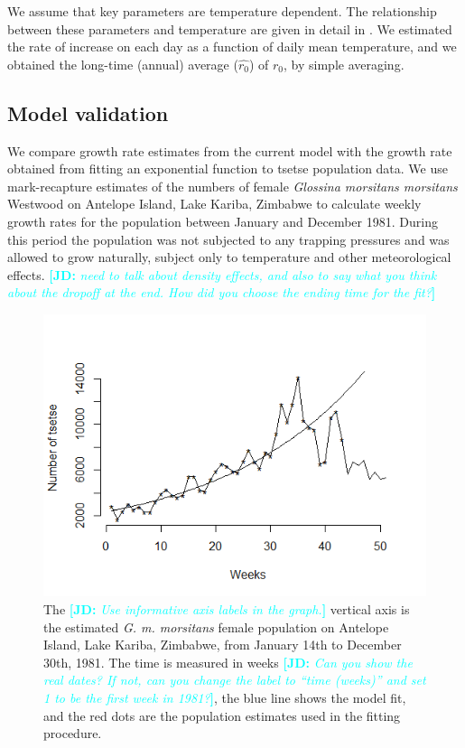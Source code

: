 \documentclass[12pt,a4paper]{article}
\newcommand{\comment}[3]{\textcolor{#1}{\textbf{[#2: }\textsl{#3}\textbf{]}}}
\newcommand{\jd}[1]{\comment{cyan}{JD}{#1}}
\begin{document}
We assume that key parameters are temperature dependent. The relationship between these parameters and temperature are given in detail in \cite{Are2019}. We estimated the rate of increase on each day as a function of daily mean temperature, and we obtained the long-time (annual) average ($\hat{r_0}$)  of $r_0$, by simple averaging.

\subsection*{Model validation}
We compare growth rate estimates from the current model with the growth rate obtained from fitting an exponential function to tsetse population data. We use mark-recapture estimates of the numbers of female \textit{Glossina morsitans morsitans} Westwood on Antelope Island, Lake Kariba, Zimbabwe \cite{hargrove1998optimized} to calculate weekly growth rates for the population between January and December 1981. During this period the population was not subjected to any trapping pressures and was allowed to grow naturally, subject only to temperature and other meteorological effects. \jd{need to talk about density effects, and also to say what you think about the dropoff at the end. How did you choose the ending time for the fit?}

\begin{figure}[hbt!]
	\centering
	\includegraphics[width=0.9\linewidth]{Feb_06_fitGrouwthRate}
	\caption{The \jd{Use informative axis labels in the graph.} vertical axis is the estimated \textit{G. m. morsitans} female population on Antelope Island, Lake Kariba, Zimbabwe, from January 14th to December 30th, 1981. The time is measured in weeks \jd{Can you show the real dates? If not, can you change the label to “time (weeks)” and set 1 to be the first week in 1981?}, the blue line shows the model fit, and the red dots are the population estimates used in the fitting procedure.}
	\label{fig:antelopeEst}
\end{figure}
\end{document}
